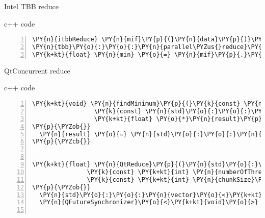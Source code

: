 \documentclass{beamer}
\begin{document}
\begin{frame}[fragile]{Intel TBB reduce}
\begin{block}{c++ code}
\begin{Verbatim}[commandchars=\\\{\},numbers=left,firstnumber=1,stepnumber=1]
\PY{n}{itbbReduce} \PY{n}{mif}\PY{p}{(}\PY{n}{data}\PY{p}{)}\PY{p}{;}
\PY{n}{tbb}\PY{o}{:}\PY{o}{:}\PY{n}{parallel\PYZus{}reduce}\PY{p}{(}\PY{n}{tbb}\PY{o}{:}\PY{o}{:}\PY{n}{blocked\PYZus{}range}\PY{o}{<}\PY{n}{size\PYZus{}t}\PY{o}{>}\PY{p}{(}\PY{l+m+mi}{0}\PY{p}{,} \PY{n}{data}\PY{p}{.}\PY{n}{size}\PY{p}{(}\PY{p}{)}\PY{p}{,} \PY{n}{CHUNK\PYZus{}SIZE}\PY{p}{)}\PY{p}{,} \PY{n}{mif}\PY{p}{)}\PY{p}{;}
\PY{k+kt}{float} \PY{n}{min} \PY{o}{=} \PY{n}{mif}\PY{p}{.}\PY{n}{m\PYZus{}min}\PY{p}{;}
\end{Verbatim}

\end{block}

\end{frame}


\begin{frame}[fragile]{QtConcurrent reduce}

\begin{block}{c++ code}

\tiny
\begin{Verbatim}[commandchars=\\\{\},numbers=left,firstnumber=1,stepnumber=1]
\PY{k+kt}{void} \PY{n}{findMinimum}\PY{p}{(}\PY{k}{const} \PY{n}{std}\PY{o}{:}\PY{o}{:}\PY{n}{vector}\PY{o}{<}\PY{k+kt}{float}\PY{o}{>}\PY{o}{:}\PY{o}{:}\PY{n}{const\PYZus{}iterator} \PY{n}{begin}\PY{p}{,}
                 \PY{k}{const} \PY{n}{std}\PY{o}{:}\PY{o}{:}\PY{n}{vector}\PY{o}{<}\PY{k+kt}{float}\PY{o}{>}\PY{o}{:}\PY{o}{:}\PY{n}{const\PYZus{}iterator} \PY{n}{end}\PY{p}{,}
                 \PY{k+kt}{float} \PY{o}{*}\PY{n}{result}\PY{p}{)}
\PY{p}{\PYZob{}}
  \PY{n}{result} \PY{o}{=} \PY{n}{std}\PY{o}{:}\PY{o}{:}\PY{n}{min\PYZus{}element}\PY{p}{(}\PY{n}{begin}\PY{p}{,} \PY{n}{end}\PY{p}{)}\PY{p}{;}
\PY{p}{\PYZcb{}}


\PY{k+kt}{float} \PY{n}{QtReduce}\PY{p}{(}\PY{n}{std}\PY{o}{:}\PY{o}{:}\PY{n}{vector}\PY{o}{<}\PY{k+kt}{float}\PY{o}{>}\PY{o}{&} \PY{n}{data}\PY{p}{,}
               \PY{k}{const} \PY{k+kt}{int} \PY{n}{numberOfThreads}\PY{p}{,}
               \PY{k}{const} \PY{k+kt}{int} \PY{n}{chunkSize}\PY{p}{)}
\PY{p}{\PYZob{}}
  \PY{n}{std}\PY{o}{:}\PY{o}{:}\PY{n}{vector}\PY{o}{<}\PY{k+kt}{float}\PY{o}{>} \PY{n}{separate\PYZus{}results}\PY{p}{(}\PY{n}{numberOfThreads}\PY{p}{,} \PY{n}{FLT\PYZus{}MAX}\PY{p}{)}\PY{p}{;}
  \PY{n}{QFutureSynchronizer}\PY{o}{<}\PY{k+kt}{void}\PY{o}{>} \PY{n}{synchronizer}\PY{p}{;}


\end{Verbatim}
\end{block}
\end{frame}
\end{document}
